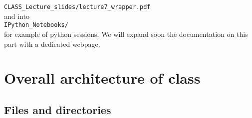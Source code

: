 \documentclass{article}
\begin{document}
\begin{itemize}
 {\tt CLASS\_Lecture\_slides/lecture7\_wrapper.pdf}\\
 
  and into\\
  
{\tt IPython\_Notebooks/}\\

 for example of python sessions. We will expand soon the documentation on this part with a dedicated webpage.


\end{itemize}

\section{Overall architecture of {\sc class}}

\subsection{Files and directories}
\end{document}
